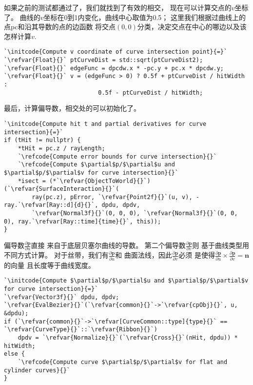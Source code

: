 如果之前的测试都通过了，我们就找到了有效的相交，
现在可以计算交点的$v$坐标了。
曲线的$v$坐标在0到1内变化，曲线中心取值为0.5；
这里我们根据过曲线上的点{\ttfamily pc}和沿其导数的点的边函数
将交点$(0,0)$分类，决定交点在中心的哪边以及该怎样计算$v$.
\begin{lstlisting}
`\initcode{Compute v coordinate of curve intersection point}{=}`
`\refvar{Float}{}` ptCurveDist = std::sqrt(ptCurveDist2);
`\refvar{Float}{}` edgeFunc = dpcdw.x * -pc.y + pc.x * dpcdw.y;
`\refvar{Float}{}` v = (edgeFunc > 0) ? 0.5f + ptCurveDist / hitWidth :
                           0.5f - ptCurveDist / hitWidth;
\end{lstlisting}

最后，计算偏导数，相交处的可以初始化了。
\begin{lstlisting}
`\initcode{Compute hit t and partial derivatives for curve intersection}{=}`
if (tHit != nullptr) {
    *tHit = pc.z / rayLength;
    `\refcode{Compute error bounds for curve intersection}{}`
    `\refcode{Compute $\partial$p/$\partial$u and $\partial$p/$\partial$v for curve intersection}{}`
    *isect = (*`\refvar{ObjectToWorld}{}`)(`\refvar{SurfaceInteraction}{}`(
        ray(pc.z), pError, `\refvar{Point2f}{}`(u, v), -ray.`\refvar[Ray::d]{d}{}`, dpdu, dpdv,
        `\refvar{Normal3f}{}`(0, 0, 0), `\refvar{Normal3f}{}`(0, 0, 0), ray.`\refvar[Ray::time]{time}{}`, this));
}
\end{lstlisting}

偏导数$\displaystyle\frac{\partial \bm p}{\partial u}$直接
来自于底层贝塞尔曲线的导数。
第二个偏导数$\displaystyle\frac{\partial \bm p}{\partial v}$则
基于曲线类型用不同方式计算。
对于丝带，我们有$\displaystyle\frac{\partial \bm p}{\partial u}$和
曲面法线，因此$\displaystyle\frac{\partial \bm p}{\partial v}$必须
是使得$\displaystyle\frac{\partial \bm p}{\partial u}\times\frac{\partial \bm p}{\partial v}=\bm n$的向量
且长度等于曲线宽度。
\begin{lstlisting}
`\initcode{Compute $\partial$p/$\partial$u and $\partial$p/$\partial$v for curve intersection}{=}`
`\refvar{Vector3f}{}` dpdu, dpdv;
`\refvar{EvalBezier}{}`(`\refvar{common}{}`->`\refvar{cpObj}{}`, u, &dpdu);
if (`\refvar{common}{}`->`\refvar[CurveCommon::type]{type}{}` == `\refvar{CurveType}{}`::`\refvar{Ribbon}{}`)
    dpdv = `\refvar{Normalize}{}`(`\refvar{Cross}{}`(nHit, dpdu)) * hitWidth;
else {
    `\refcode{Compute curve $\partial$p/$\partial$v for flat and cylinder curves}{}`
}
\end{lstlisting}

